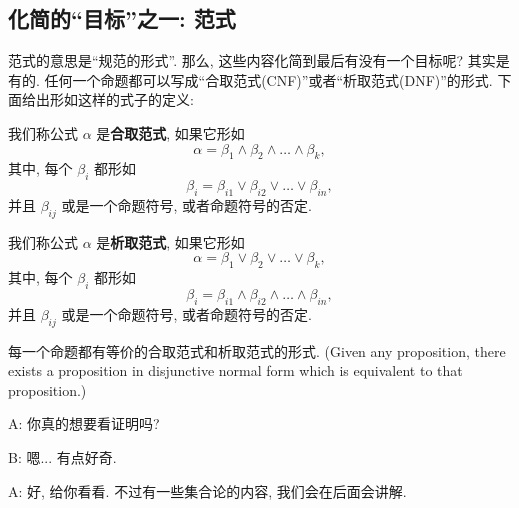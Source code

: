 \subsection{化简的``目标''之一: 范式}

范式的意思是``规范的形式''. 那么, 这些内容化简到最后有没有一个目标呢? 其实是有的. 任何一个命题都可以写成``合取范式(CNF)''或者``析取范式(DNF)''的形式. 下面给出形如这样的式子的定义:

 
\begin{definition}
            我们称公式 $\alpha$ 是{\bf 合取范式}, 如果它形如
            \[
              \alpha = \beta_{1} \land \beta_{2} \land \dots \land \beta_{k},
            \]
            其中, 每个 $\beta_{i}$ 都形如
            \[
              \beta_{i} = \beta_{i1} \lor \beta_{i2} \lor \dots \lor \beta_{in},
            \]
            并且 $\beta_{ij}$ 或是一个命题符号, 或者命题符号的否定. 
    \end{definition}


   \begin{definition}
            我们称公式 $\alpha$ 是{\bf 析取范式}, 如果它形如
            \[
              \alpha = \beta_{1} \lor \beta_{2} \lor \dots \lor \beta_{k},
            \]
            其中, 每个 $\beta_{i}$ 都形如
            \[
              \beta_{i} = \beta_{i1} \land \beta_{i2} \land \dots \land \beta_{in},
            \]
            并且 $\beta_{ij}$ 或是一个命题符号, 或者命题符号的否定. 
    \end{definition}

\begin{theorem}
	每一个命题都有等价的合取范式和析取范式的形式. (Given any proposition, there exists a proposition in disjunctive normal form which is equivalent to that proposition.)
\end{theorem}

\begin{dialogue}
A: 你真的想要看证明吗?

B: 嗯... 有点好奇. 

A: 好, 给你看看. 不过有一些集合论的内容, 我们会在后面会讲解. 

\end{dialogue}



